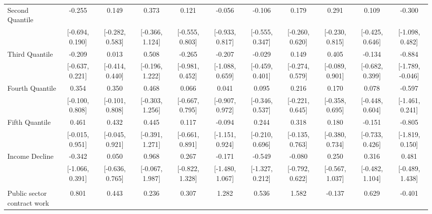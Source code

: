 \documentclass[
  10,
  letterpaper,
  DIV=11,
  numbers=noendperiod]{scrartcl}
\begin{document}
\begin{table}
\begin{tabular}[t]{lcccccccccc}
\hspace{1em}Second Quantile & -0.255 & 0.149 & 0.373 & 0.121 & -0.056 & -0.106 & 0.179 & 0.291 & 0.109 & -0.300\\
\hspace{1em} & {}[-0.694, 0.190] & {}[-0.282, 0.583] & {}[-0.366, 1.124] & {}[-0.555, 0.803] & {}[-0.933, 0.817] & {}[-0.555, 0.347] & {}[-0.260, 0.620] & {}[-0.230, 0.815] & {}[-0.425, 0.646] & {}[-1.098, 0.482]\\
\hspace{1em}Third Quantile & -0.209 & 0.013 & 0.508 & -0.265 & -0.207 & -0.029 & 0.149 & 0.405 & -0.134 & -0.884\\
\hspace{1em} & {}[-0.637, 0.221] & {}[-0.414, 0.440] & {}[-0.196, 1.222] & {}[-0.981, 0.452] & {}[-1.088, 0.659] & {}[-0.459, 0.401] & {}[-0.274, 0.579] & {}[-0.089, 0.901] & {}[-0.682, 0.399] & {}[-1.789, -0.046]\\
\hspace{1em}Fourth Quantile & 0.354 & 0.350 & 0.468 & 0.066 & 0.041 & 0.095 & 0.216 & 0.170 & 0.078 & -0.597\\
\hspace{1em} & {}[-0.100, 0.808] & {}[-0.101, 0.808] & {}[-0.303, 1.256] & {}[-0.667, 0.795] & {}[-0.907, 0.972] & {}[-0.346, 0.537] & {}[-0.221, 0.645] & {}[-0.358, 0.695] & {}[-0.448, 0.604] & {}[-1.461, 0.241]\\
\hspace{1em}Fifth Quantile & 0.461 & 0.432 & 0.445 & 0.117 & -0.094 & 0.244 & 0.318 & 0.180 & -0.151 & -0.805\\
\hspace{1em} & {}[-0.015, 0.951] & {}[-0.045, 0.921] & {}[-0.391, 1.271] & {}[-0.661, 0.891] & {}[-1.151, 0.924] & {}[-0.210, 0.696] & {}[-0.135, 0.763] & {}[-0.380, 0.734] & {}[-0.733, 0.426] & {}[-1.819, 0.150]\\
\hspace{1em}Income Decline & -0.342 & 0.050 & 0.968 & 0.267 & -0.171 & -0.549 & -0.080 & 0.250 & 0.316 & 0.481\\
\hspace{1em} & {}[-1.066, 0.391] & {}[-0.636, 0.765] & {}[-0.067, 1.987] & {}[-0.822, 1.328] & {}[-1.480, 1.067] & {}[-1.327, 0.212] & {}[-0.792, 0.622] & {}[-0.567, 1.037] & {}[-0.482, 1.104] & {}[-0.489, 1.438]\\
\addlinespace[0.3em]
\multicolumn{11}{l}{\cellcolor[HTML]{3498DB}{\textbf{Income Source}}}\\
\hspace{1em}Public sector contract work & 0.801 & 0.443 & 0.236 & 0.307 & 1.282 & 0.536 & 1.582 & -0.137 & 0.629 & -0.401\\

\end{tabular}
\end{table}
\end{document}
